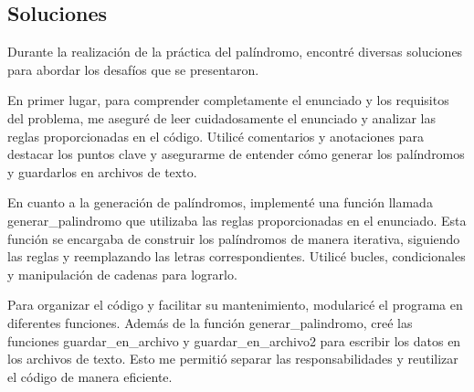\subsection{Soluciones}
Durante la realización de la práctica del palíndromo, encontré diversas soluciones para abordar los desafíos que se presentaron.\newline

En primer lugar, para comprender completamente el enunciado y los requisitos del problema, me aseguré de leer cuidadosamente el enunciado y analizar las reglas proporcionadas en el código. Utilicé comentarios y anotaciones para destacar los puntos clave y asegurarme de entender cómo generar los palíndromos y guardarlos en archivos de texto.\newline

En cuanto a la generación de palíndromos, implementé una función llamada generar\_palindromo que utilizaba las reglas proporcionadas en el enunciado. Esta función se encargaba de construir los palíndromos de manera iterativa, siguiendo las reglas y reemplazando las letras correspondientes. Utilicé bucles, condicionales y manipulación de cadenas para lograrlo.\newline

Para organizar el código y facilitar su mantenimiento, modularicé el programa en diferentes funciones. Además de la función generar\_palindromo, creé las funciones guardar\_en\_archivo y guardar\_en\_archivo2 para escribir los datos en los archivos de texto. Esto me permitió separar las responsabilidades y reutilizar el código de manera eficiente.\newline


